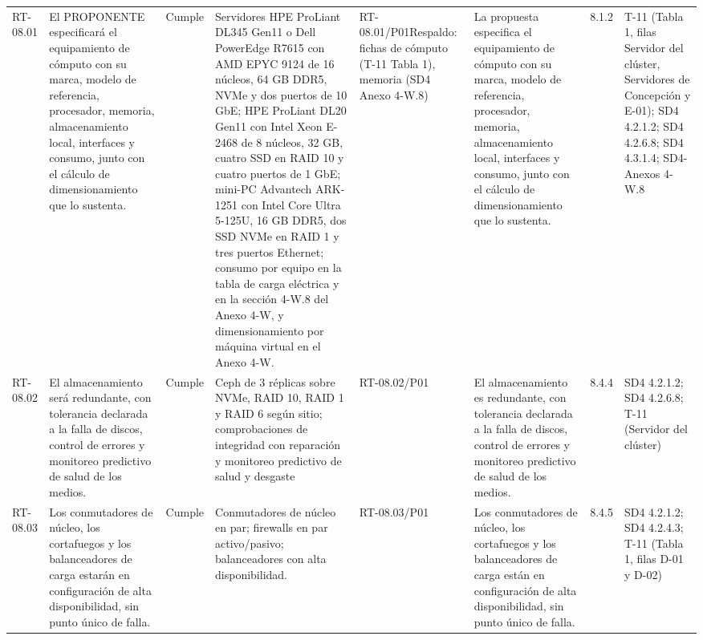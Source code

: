 \documentclass[oficio,firma,final]{lafrox}
\begin{document}
\begin{landscape}
{\begin{longtable}{@{}F{0.054} F{0.173} F{0.061} F{0.191} F{0.106} F{0.180} F{0.067} F{0.168}@{}}
  RT-08.01 & El PROPONENTE especificará el equipamiento de cómputo con su marca, modelo de referencia, procesador, memoria, almacenamiento local, interfaces y consumo, junto con el cálculo de dimensionamiento que lo sustenta. & Cumple & Servidores HPE ProLiant DL345 Gen11 o Dell PowerEdge R7615 con AMD EPYC 9124 de 16 núcleos, 64 GB DDR5, NVMe y dos puertos de 10 GbE; HPE ProLiant DL20 Gen11 con Intel Xeon E-2468 de 8 núcleos, 32 GB, cuatro SSD en RAID 10 y cuatro puertos de 1 GbE; mini-PC Advantech ARK-1251 con Intel Core Ultra 5-125U, 16 GB DDR5, dos SSD NVMe en RAID 1 y tres puertos Ethernet; consumo por equipo en la tabla de carga eléctrica y en la sección 4-W.8 del Anexo 4-W, y dimensionamiento por máquina virtual en el Anexo 4-W. & RT-08.01/\allowbreak{}P01\newline Respaldo: fichas de cómputo (T-11 Tabla 1), memoria (SD4 Anexo 4-W.8) & La propuesta especifica el equipamiento de cómputo con su marca, modelo de referencia, procesador, memoria, almacenamiento local, interfaces y consumo, junto con el cálculo de dimensionamiento que lo sustenta. & 8.1.2 & T-11 (Tabla 1, filas Servidor del clúster, Servidores de Concepción y E-01); SD4 4.2.1.2; SD4 4.2.6.8; SD4 4.3.1.4; SD4-Anexos 4-W.8  \\
  RT-08.02 & El almacenamiento será redundante, con tolerancia declarada a la falla de discos, control de errores y monitoreo predictivo de salud de los medios. & Cumple & Ceph de 3 réplicas sobre NVMe, RAID 10, RAID 1 y RAID 6 según sitio; comprobaciones de integridad con reparación y monitoreo predictivo de salud y desgaste & RT-08.02/\allowbreak{}P01 & El almacenamiento es redundante, con tolerancia declarada a la falla de discos, control de errores y monitoreo predictivo de salud de los medios. & 8.4.4 & SD4 4.2.1.2; SD4 4.2.6.8; T-11 (Servidor del clúster)  \\
  RT-08.03 & Los conmutadores de núcleo, los cortafuegos y los balanceadores de carga estarán en configuración de alta disponibilidad, sin punto único de falla. & Cumple & Conmutadores de núcleo en par; firewalls en par activo/pasivo; balanceadores con alta disponibilidad. & RT-08.03/\allowbreak{}P01 & Los conmutadores de núcleo, los cortafuegos y los balanceadores de carga están en configuración de alta disponibilidad, sin punto único de falla. & 8.4.5 & SD4 4.2.1.2; SD4 4.2.4.3; T-11 (Tabla 1, filas D-01 y D-02)  \\

\end{longtable}}
\end{landscape}
\end{document}
